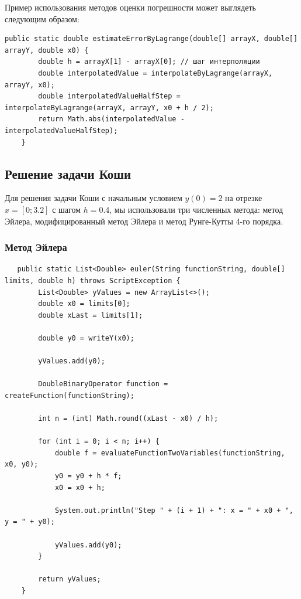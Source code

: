 \documentclass[12pt]{article}
\begin{document}
Пример использования методов оценки погрешности может выглядеть следующим образом:

\begin{verbatim}
public static double estimateErrorByLagrange(double[] arrayX, double[] arrayY, double x0) {
        double h = arrayX[1] - arrayX[0]; // шаг интерполяции
        double interpolatedValue = interpolateByLagrange(arrayX, arrayY, x0);
        double interpolatedValueHalfStep = interpolateByLagrange(arrayX, arrayY, x0 + h / 2);
        return Math.abs(interpolatedValue - interpolatedValueHalfStep);
    }
\end{verbatim}

\subsection{Решение задачи Коши}

Для решения задачи Коши с начальным условием $y(0)=2$ на отрезке $x=[0;3.2]$ с шагом $h=0.4$, мы использовали три численных метода: метод Эйлера, модифицированный метод Эйлера и метод Рунге-Кутты 4-го порядка.

\subsubsection{Метод Эйлера}


\begin{verbatim}
   public static List<Double> euler(String functionString, double[] limits, double h) throws ScriptException {
        List<Double> yValues = new ArrayList<>();
        double x0 = limits[0];
        double xLast = limits[1];

        double y0 = writeY(x0);

        yValues.add(y0);

        DoubleBinaryOperator function = createFunction(functionString);

        int n = (int) Math.round((xLast - x0) / h);

        for (int i = 0; i < n; i++) {
            double f = evaluateFunctionTwoVariables(functionString, x0, y0);
            y0 = y0 + h * f;
            x0 = x0 + h;

            System.out.println("Step " + (i + 1) + ": x = " + x0 + ", y = " + y0);

            yValues.add(y0);
        }

        return yValues;
    }
\end{verbatim}
\end{document}
